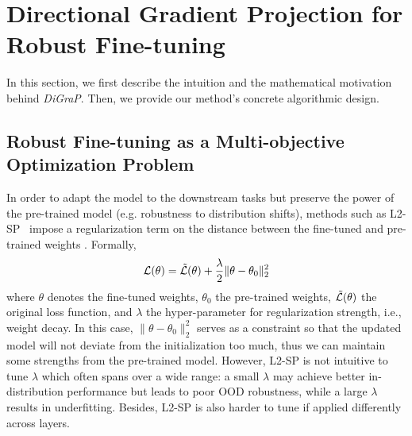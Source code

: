 \section{Directional Gradient Projection for Robust Fine-tuning}
In this section, we first describe the intuition and the mathematical motivation behind \emph{DiGraP}. Then, we provide our method's concrete algorithmic design.




\subsection{Robust Fine-tuning as a Multi-objective Optimization Problem}
In order to adapt the model to the downstream tasks but preserve the power of the pre-trained model (e.g. robustness to distribution shifts), methods such as L2-SP~\citep{li_explicit_2018} impose a regularization term on the distance between the fine-tuned and pre-trained weights%
. Formally,
\begin{align}
    \label{eq:l2_sp}
    \mathcal{L(\theta)} = \Tilde{\mathcal{L}}(\theta) + \frac{\lambda}{2}\|\theta-\theta_0\|^2_2
\end{align}
where $\theta$ denotes the fine-tuned weights, $\theta_0$ the pre-trained weights, $\Tilde{\mathcal{L}}(\theta)$ the original loss function, and $\lambda$ the hyper-parameter for regularization strength, i.e., weight decay. In this case, $\|\theta-\theta_0\|^2_2$ serves as a constraint so that the updated model will not deviate from the initialization too much, thus we can maintain some strengths from the pre-trained model. However, L2-SP is not intuitive to tune $\lambda$ which often spans over a wide range: a small $\lambda$ may achieve better in-distribution performance but leads to poor OOD robustness, while a large $\lambda$ results in underfitting. Besides, L2-SP is also harder to tune if applied differently across layers. 

